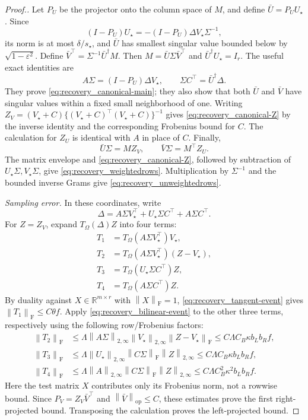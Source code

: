 \documentclass[numsec,webpdf,modern,large,namedate]{oup-authoring-template}
\theoremstyle{plain}
\theoremstyle{remark}
\providecommand{\op}{\mathrm{op}}
\providecommand{\F}{\mathrm{F}}
\providecommand{\TT}{T_\Omega}
\providecommand{\norm}[1]{\left\|#1\right\|}
\newif\ifmarkchanges
\newenvironment{revision}{\begingroup\ifmarkchanges\color{red}\fi}{\endgroup}
\begin{document}
\begin{revision}
\begin{proof}[Proof.]
Let $P_U$ be the projector onto the column space of $M$, and define
$\bar U=P_U U_\star$.  Since
\[
 (I-P_U)U_\star=-(I-P_U)\Delta V_\star\Sigma^{-1},
\]
its norm is at most $\delta/s_\star$, and $\bar U$ has smallest singular
value bounded below by $\sqrt{1-\varepsilon^2}$.  Define
$\bar V^\top=\Sigma^{-1}\bar U^\dagger M$.  Then
$M=\bar U\Sigma\bar V^\top$ and $\bar U^\dagger U_\star=I_r$.
The useful exact identities are
\[
 A\Sigma=(I-P_U)\Delta V_\star,\qquad
 \Sigma C^\top=\bar U^\dagger\Delta.
\]
They prove \eqref{eq:recovery_canonical-main}; they also show that both $\bar U$
and $\bar V$ have singular values within a fixed small neighborhood of one.
Writing $Z_V=(V_\star+C)\{(V_\star+C)^\top(V_\star+C)\}^{-1}$ gives
\eqref{eq:recovery_canonical-Z} by the inverse identity and the corresponding
Frobenius bound for $C$.  The calculation for $Z_U$ is identical with
$A$ in place of $C$.
Finally,
\[
 \bar U\Sigma=M Z_V,\qquad \bar V\Sigma=M^\top Z_U.
\]
The matrix envelope and \eqref{eq:recovery_canonical-Z}, followed by subtraction
of $U_\star\Sigma,V_\star\Sigma$, give \eqref{eq:recovery_weightedrows}.
Multiplication by $\Sigma^{-1}$ and the bounded inverse Grams give
\eqref{eq:recovery_unweightedrows}.

\textit{Sampling error.} In these coordinates, write
\[
 \Delta=A\Sigma V_\star^\top+U_\star\Sigma C^\top+A\Sigma C^\top.
\]
For $Z=Z_V$, expand $\TT(\Delta)Z$ into four terms:
\begin{align*}
 T_1&=\TT(A\Sigma V_\star^\top)V_\star,\\
 T_2&=\TT(A\Sigma V_\star^\top)(Z-V_\star),\\
 T_3&=\TT(U_\star\Sigma C^\top)Z,\\
 T_4&=\TT(A\Sigma C^\top)Z.
\end{align*}
By duality against $X\in\mathbb R^{m\times r}$ with $\norm{X}_\F=1$,
\eqref{eq:recovery_tangent-event} gives $\norm{T_1}_\F\le C\theta f$.
Apply \eqref{eq:recovery_bilinear-event} to the other three terms, respectively
using the following row/Frobenius factors:
\begin{align*}
 \norm{T_2}_\F&\le
 \Lambda\norm{A\Sigma}_{2,\infty}\norm{V_\star}_{2,\infty}
 \norm{Z-V_\star}_\F
 \le C\Lambda C_B\kappa b_Lb_R f,\\
 \norm{T_3}_\F&\le
 \Lambda\norm{U_\star}_{2,\infty}\norm{C\Sigma}_\F\norm{Z}_{2,\infty}
 \le C\Lambda C_B\kappa b_Lb_R f,\\
 \norm{T_4}_\F&\le
 \Lambda\norm{A}_{2,\infty}\norm{C\Sigma}_\F\norm{Z}_{2,\infty}
 \le C\Lambda C_B^2\kappa^2 b_Lb_R f.
\end{align*}
Here the test matrix $X$ contributes only its Frobenius norm, not a
rowwise bound.  Since $P_V=Z_V\bar V^\top$ and
$\norm{\bar V}_\op\le C$, these estimates prove the first right-projected
bound.  Transposing the calculation proves the left-projected bound.


\end{proof}
\end{revision}
\end{document}
